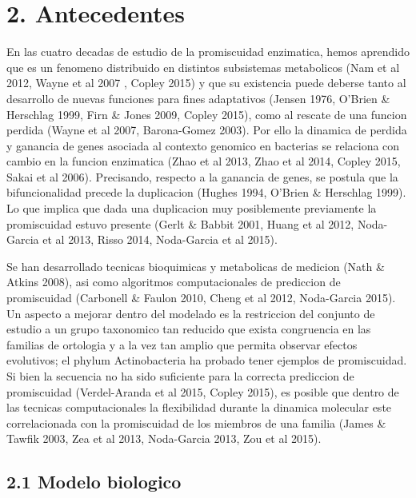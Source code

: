 \documentclass[12pt,twoside]{reedthesis}
\begin{document}
  \section{2. Antecedentes}\label{antecedentes}
  
  En las cuatro decadas de estudio de la promiscuidad enzimatica, hemos
  aprendido que es un fenomeno distribuido en distintos subsistemas
  metabolicos (Nam et al 2012, Wayne et al 2007 , Copley 2015) y que su
  existencia puede deberse tanto al desarrollo de nuevas funciones para
  fines adaptativos (Jensen 1976, O'Brien \& Herschlag 1999, Firn \& Jones
  2009, Copley 2015), como al rescate de una funcion perdida (Wayne et al
  2007, Barona-Gomez 2003). Por ello la dinamica de perdida y ganancia de
  genes asociada al contexto genomico en bacterias se relaciona con cambio
  en la funcion enzimatica (Zhao et al 2013, Zhao et al 2014, Copley 2015,
  Sakai et al 2006). Precisando, respecto a la ganancia de genes, se
  postula que la bifuncionalidad precede la duplicacion (Hughes 1994,
  O'Brien \& Herschlag 1999). Lo que implica que dada una duplicacion muy
  posiblemente previamente la promiscuidad estuvo presente (Gerlt \&
  Babbit 2001, Huang et al 2012, Noda-Garcia et al 2013, Risso 2014,
  Noda-Garcia et al 2015).
  
  Se han desarrollado tecnicas bioquimicas y metabolicas de medicion (Nath
  \& Atkins 2008), asi como algoritmos computacionales de prediccion de
  promiscuidad (Carbonell \& Faulon 2010, Cheng et al 2012, Noda-Garcia
  2015). Un aspecto a mejorar dentro del modelado es la restriccion del
  conjunto de estudio a un grupo taxonomico tan reducido que exista
  congruencia en las familias de ortologia y a la vez tan amplio que
  permita observar efectos evolutivos; el phylum Actinobacteria ha probado
  tener ejemplos de promiscuidad. Si bien la secuencia no ha sido
  suficiente para la correcta prediccion de promiscuidad (Verdel-Aranda et
  al 2015, Copley 2015), es posible que dentro de las tecnicas
  computacionales la flexibilidad durante la dinamica molecular este
  correlacionada con la promiscuidad de los miembros de una familia (James
  \& Tawfik 2003, Zea et al 2013, Noda-Garcia 2013, Zou et al 2015).
  
  \subsection{2.1 Modelo biologico}\label{modelo-biologico}
  
\end{document}
